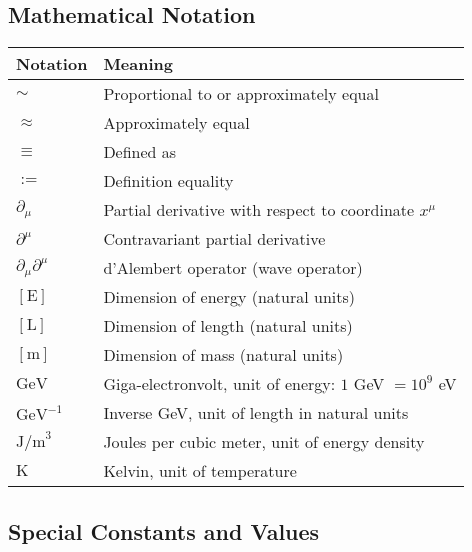 \documentclass[12pt,a4paper]{article}
\numberwithin{equation}{section}
\begin{document}
	\subsection*{Mathematical Notation}
	
	\begin{longtable}{p{2cm} p{12cm}}
		\toprule
		\textbf{Notation} & \textbf{Meaning} \\
		\midrule
		\endhead
		
		$\sim$ & Proportional to or approximately equal \\
		$\approx$ & Approximately equal \\
		$\equiv$ & Defined as \\
		$:=$ & Definition equality \\
		$\partial_\mu$ & Partial derivative with respect to coordinate $x^\mu$ \\
		$\partial^\mu$ & Contravariant partial derivative \\
		$\partial_\mu \partial^\mu$ & d'Alembert operator (wave operator) \\
		$[\text{E}]$ & Dimension of energy (natural units) \\
		$[\text{L}]$ & Dimension of length (natural units) \\
		$[\text{m}]$ & Dimension of mass (natural units) \\
		$\text{GeV}$ & Giga-electronvolt, unit of energy: $1$ GeV $= 10^9$ eV \\
		$\text{GeV}^{-1}$ & Inverse GeV, unit of length in natural units \\
		$\text{J/m}^3$ & Joules per cubic meter, unit of energy density \\
		$\text{K}$ & Kelvin, unit of temperature \\
		\bottomrule
	\end{longtable}
	
	\subsection*{Special Constants and Values}
	
\end{document}
